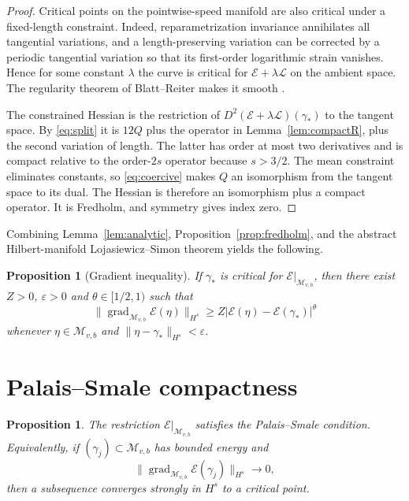 \documentclass[11pt]{article}
\newtheorem{proposition}[theorem]{Proposition}
\theoremstyle{remark}
\newcommand{\E}{\mathcal E}
\newcommand{\M}{\mathcal M}
\newcommand{\grad}{\operatorname{grad}}
\begin{document}
\begin{proof}
Critical points on the pointwise-speed manifold are also critical under a
fixed-length constraint.  Indeed, reparametrization invariance annihilates
all tangential variations, and a length-preserving variation can be corrected
by a periodic tangential variation so that its first-order logarithmic strain
vanishes.  Hence for some constant $\lambda$ the curve is critical for
$\E+\lambda\mathcal L$ on the ambient space.  The regularity theorem of
Blatt--Reiter makes it smooth \cite[Theorem 4]{BR}.

The constrained Hessian is the restriction of
$D^2(\E+\lambda\mathcal L)(\gamma_*)$ to the tangent space.  By
\eqref{eq:split} it is $12Q$ plus the operator in
Lemma~\ref{lem:compactR}, plus the second variation of length.  The latter has
order at most two derivatives and is compact relative to the order-$2s$
operator because $s>3/2$.  The mean constraint eliminates constants, so
\eqref{eq:coercive} makes $Q$ an isomorphism from the tangent space to its
dual.  The Hessian is therefore an isomorphism plus a compact operator.  It is
Fredholm, and symmetry gives index zero.
\end{proof}

Combining Lemma~\ref{lem:analytic}, Proposition~\ref{prop:fredholm}, and the
abstract Hilbert-manifold Lojasiewicz--Simon theorem
\cite[Theorem 1.4]{DF} yields the following.

\begin{proposition}[Gradient inequality]\label{prop:LS}
If $\gamma_*$ is critical for $\E|_{\M_{v,b}}$, then there exist
$Z>0$, $\varepsilon>0$ and $\theta\in[1/2,1)$ such that
\[
 \|\grad_{\M_{v,b}}\E(\eta)\|_{H^s}
 \ge Z|\E(\eta)-\E(\gamma_*)|^\theta
\]
whenever $\eta\in\M_{v,b}$ and
$\|\eta-\gamma_*\|_{H^s}<\varepsilon$.
\end{proposition}

\section{Palais--Smale compactness}

\begin{proposition}\label{prop:PS}
The restriction $\E|_{\M_{v,b}}$ satisfies the Palais--Smale condition.
Equivalently, if $(\gamma_j)\subset\M_{v,b}$ has bounded energy and
\[\|\grad_{\M_{v,b}}\E(\gamma_j)\|_{H^s}\to0,\]
then a subsequence converges strongly in $H^s$ to a critical point.
\end{proposition}
\end{document}
